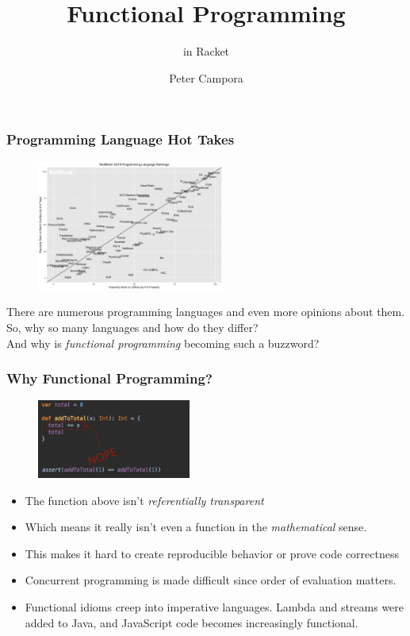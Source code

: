 \documentclass{beamer}
\title{Functional Programming}
\subtitle{in Racket}
\author{Peter Campora}
\institute{ULL}
\begin{document}
\begin{frame}
\titlepage
\end{frame}

\begin{frame}
  \frametitle{Programming Language Hot Takes}
  \begin{figure}[t]
    \centering \includegraphics[width=0.55\textwidth]{images/LotsOfLanguages.png}
  \end{figure}
  \pause
  There are numerous programming languages and even more opinions about them.\\
  \pause
  So, why so many languages and how do they differ?\\
  \pause
  And why is \emph{functional programming} becoming such a buzzword?
\end{frame}

\begin{frame}
  \frametitle{Why Functional Programming?}
  \begin{figure}[t]
    \centering \includegraphics[width=0.45\textwidth]{images/referential-transparency.png}
  \end{figure}
  \begin{itemize}
  \item<2-> The function above isn't \emph{referentially transparent}
  \item<3-> Which means it really isn't even a function in the \emph{mathematical} sense.
  \item<4-> This makes it hard to create reproducible behavior or prove code correctness
  \item<5-> Concurrent programming is made difficult since order of evaluation matters.
  \item<6-> Functional idioms creep into imperative languages. Lambda and streams
    were added to Java, and JavaScript code becomes increasingly functional.
  \end{itemize}
\end{frame}
 
\end{document}

